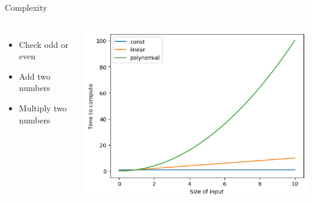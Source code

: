 \documentclass{beamer}
\begin{document}
\begin{frame}{Complexity}
    \begin{columns}
    \begin{itemize}
        \item Check odd or even\\
        \item Add two numbers \\
        \item Multiply two numbers \\
    \end{itemize}
    \includegraphics[width=\columnwidth]{images/complex2.png}
    \end{columns}
\end{frame}
\end{document}
